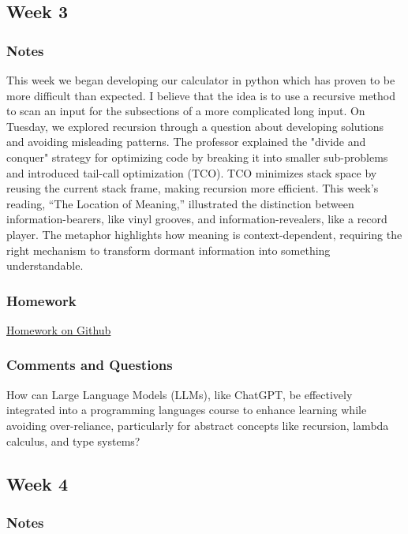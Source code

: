 \documentclass{article}
\theoremstyle{theorem}
\theoremstyle{definition}
\theoremstyle{remark}
\begin{document}
\subsection{Week 3}



\subsubsection*{Notes}
This week we began developing our calculator in python which has proven to be more difficult than expected. I believe that the idea is to use a recursive method to scan an input for the subsections of a more complicated long input. On Tuesday, we explored recursion through a question about developing solutions and avoiding misleading patterns. The professor explained the "divide and conquer" strategy for optimizing code by breaking it into smaller sub-problems and introduced tail-call optimization (TCO). TCO minimizes stack space by reusing the current stack frame, making recursion more efficient. This week’s reading, “The Location of Meaning,” illustrated the distinction between information-bearers, like vinyl grooves, and information-revealers, like a record player. The metaphor highlights how meaning is context-dependent, requiring the right mechanism to transform dormant information into something understandable.

\subsubsection*{Homework}

\href{https://github.com/YoniKazovsky/reportrepo/tree/main/LLM-Literature-Review-PL}{Homework on Github}

\subsubsection*{Comments and Questions}

How can Large Language Models (LLMs), like ChatGPT, be effectively integrated into a programming languages course to enhance learning while avoiding over-reliance, particularly for abstract concepts like recursion, lambda calculus, and type systems?

\subsection{Week 4}



\subsubsection*{Notes}
\end{document}
